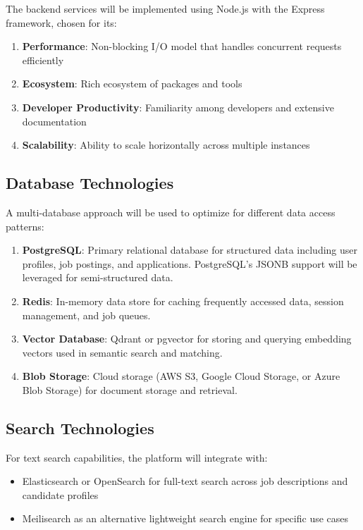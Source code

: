 \documentclass[12pt,a4paper]{report}
\begin{document}
The backend services will be implemented using Node.js with the Express framework, chosen for its:
\begin{enumerate}
    \item \textbf{Performance}: Non-blocking I/O model that handles concurrent requests efficiently
    \item \textbf{Ecosystem}: Rich ecosystem of packages and tools
    \item \textbf{Developer Productivity}: Familiarity among developers and extensive documentation
    \item \textbf{Scalability}: Ability to scale horizontally across multiple instances
\end{enumerate}

\subsection*{Database Technologies}

A multi-database approach will be used to optimize for different data access patterns:

\begin{enumerate}
    \item \textbf{PostgreSQL}: Primary relational database for structured data including user profiles, job postings, and applications. PostgreSQL's JSONB support will be leveraged for semi-structured data.
    \item \textbf{Redis}: In-memory data store for caching frequently accessed data, session management, and job queues.
    \item \textbf{Vector Database}: Qdrant or pgvector for storing and querying embedding vectors used in semantic search and matching.
    \item \textbf{Blob Storage}: Cloud storage (AWS S3, Google Cloud Storage, or Azure Blob Storage) for document storage and retrieval.
\end{enumerate}

\subsection*{Search Technologies}

For text search capabilities, the platform will integrate with:
\begin{itemize}
    \item Elasticsearch or OpenSearch for full-text search across job descriptions and candidate profiles
    \item Meilisearch as an alternative lightweight search engine for specific use cases
\end{itemize}
\end{document}
